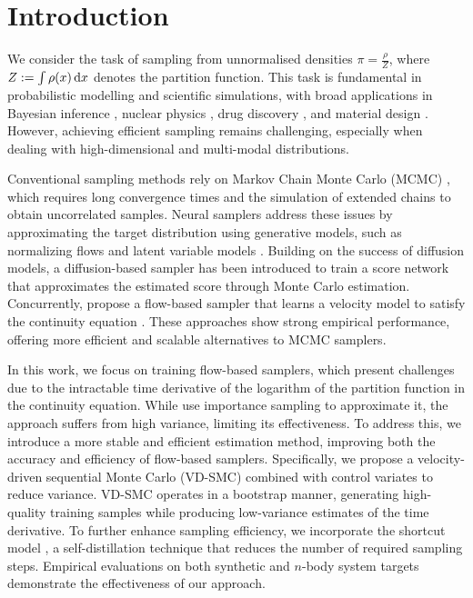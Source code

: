 \section{Introduction}
We consider the task of sampling from unnormalised densities $\pi = \frac{\rho}{Z} $, where $Z := \int \rho(x) \mathop{}\!\mathrm{d} x$ denotes the partition function.
This task is fundamental in probabilistic modelling and scientific simulations, with broad applications in Bayesian inference \citep{neal1993probabilistic}, nuclear physics \citep{albergo2019flow}, drug discovery \citep{xie2021mars}, and material design \citep{komanduri2000md}.
However, achieving efficient sampling remains challenging, especially when dealing with high-dimensional and multi-modal distributions.


Conventional sampling methods rely on Markov Chain Monte Carlo (MCMC) \citep{neal2012mcmc}, which requires long convergence times and the simulation of extended chains to obtain uncorrelated samples. 
Neural samplers address these issues by approximating the target distribution using generative models, such as normalizing flows \citep{midgley2022flow} and latent variable models \citep{he2024training}.
Building on the success of diffusion models, a diffusion-based sampler \citep{AkhoundSadegh2024IteratedDE} has been introduced to train a score network that approximates the estimated score through Monte Carlo estimation. 
Concurrently, \cite{tian2024liouville} propose a flow-based sampler that learns a velocity model to satisfy the continuity equation \citep{villani2009optimal}. 
These approaches show strong empirical performance, offering more efficient and scalable alternatives to MCMC samplers.

In this work, we focus on training flow-based samplers, which present challenges due to the intractable time derivative of the logarithm of the partition function in the continuity equation. While \cite{tian2024liouville} use importance sampling to approximate it, the approach suffers from high variance, limiting its effectiveness. 
To address this, we introduce a more stable and efficient estimation method, improving both the accuracy and efficiency of flow-based samplers.
Specifically, we propose a velocity-driven sequential Monte Carlo (VD-SMC) \citep{del2006sequential} combined with control variates \citep{geffner2018using} to reduce variance. VD-SMC operates in a bootstrap manner, generating high-quality training samples while producing low-variance estimates of the time derivative. To further enhance sampling efficiency, we incorporate the shortcut model \citep{frans2024one}, a self-distillation technique that reduces the number of required sampling steps.
Empirical evaluations on both synthetic and $n$-body system targets demonstrate the effectiveness of our approach.
